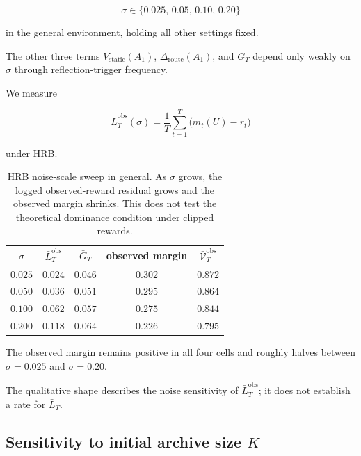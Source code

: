 \documentclass{article} %
\begin{document}
\begin{equation}
\label{eq:app-sigma-grid}
\sigma \in \{0.025,\, 0.05,\, 0.10,\, 0.20\}
\end{equation}

in the general environment, holding all other settings fixed.

The other three terms $V_{\mathrm{static}}(A_1)$, $\Delta_{\mathrm{route}}(A_1)$, and $\bar{G}_T$ depend only weakly on $\sigma$ through reflection-trigger frequency.

We measure

\begin{equation}
\label{eq:app-LT-of-sigma}
\bar L_T^{\mathrm{obs}}(\sigma)
=
\frac{1}{T}\sum_{t=1}^{T}\bigl(m_t(U)-r_t\bigr)
\end{equation}

under HRB.

\begin{table}[h]
\centering
\small
\caption{HRB noise-scale sweep in general. As \(\sigma\) grows, the logged
observed-reward residual grows and the observed margin shrinks. This does not
test the theoretical dominance condition under clipped rewards.}
\label{tab:app-sigma-sweep}
\begin{tabular}{ccccc}
\toprule
$\sigma$ & $\bar L_T^{\mathrm{obs}}$ & $\bar G_T$ & observed margin & $\bar{\mathcal V}_T^{\mathrm{obs}}$ \\
\midrule
$0.025$ & $0.024$ & $0.046$ & $0.302$ & $0.872$ \\
$0.050$ & $0.036$ & $0.051$ & $0.295$ & $0.864$ \\
$0.100$ & $0.062$ & $0.057$ & $0.275$ & $0.844$ \\
$0.200$ & $0.118$ & $0.064$ & $0.226$ & $0.795$ \\
\bottomrule
\end{tabular}

\end{table}

The observed margin remains positive in all four cells and roughly halves
between \(\sigma=0.025\) and \(\sigma=0.20\).

The qualitative shape describes the noise sensitivity of
\(\bar L_T^{\mathrm{obs}}\); it does not establish a rate for \(\bar L_T\).

\subsection{\texorpdfstring{Sensitivity to initial archive size $K$}{Sensitivity to initial archive size K}}
\end{document}
